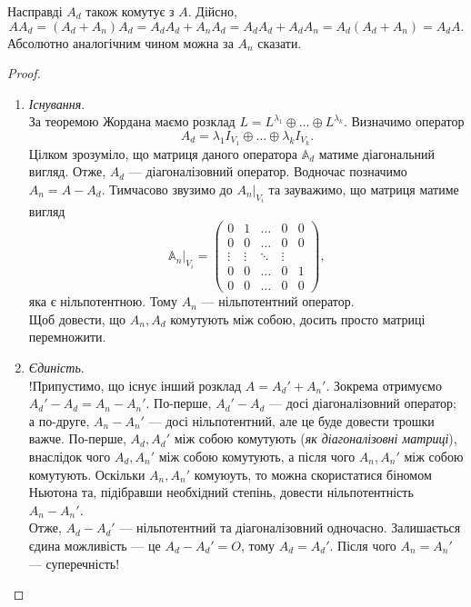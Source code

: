 \documentclass{math_library}
\begin{document}
\begin{remark}
Насправді $A_d$ також комутує з $A$. Дійсно,
\[
A A_d = (A_d + A_n) A_d = A_d A_d + A_n A_d = A_d A_d + A_d A_n = A_d (A_d + A_n) = A_d A.
\]
Абсолютно аналогічним чином можна за $A_n$ сказати.
\end{remark}

\begin{proof}
\begin{enumerate}[topsep=0pt,wide=0pt,label={\Roman*.}]
\item \textit{Існування}.\\
За теоремою Жордана маємо розклад $L = L^{\lambda_1} \oplus \dots \oplus L^{\lambda_k}$. Визначимо оператор
\[
A_d = \lambda_1 I_{V_1} \oplus \dots \oplus \lambda_k I_{V_k}.
\]
Цілком зрозуміло, що матриця даного оператора $\mathbb{A}_d$ матиме діагональний вигляд. Отже, $A_d$ --- діагоналізовний оператор. Водночас позначимо $A_n = A - A_d$. Тимчасово звузимо до ${A_n}|_{V_i}$ та зауважимо, що матриця матиме вигляд
\[ 
{\mathbb{A}_n}|_{V_i} = \begin{pmatrix}
0 & 1 & \dots & 0 & 0 \\
0 & 0 & \dots & 0 & 0\\
\vdots & \vdots & \ddots & \vdots \\
0 & 0 & \dots & 0 & 1 \\
0 & 0 & \dots & 0 & 0
\end{pmatrix},
\]
яка є нільпотентною. Тому $A_n$ --- нільпотентний оператор.\\
Щоб довести, що $A_n, A_d$ комутують між собою, досить просто матриці перемножити.

\item \textit{Єдиність}.\\
!Припустимо, що існує інший розклад $A = A_d' + A_n'$. Зокрема отримуємо $A_d' - A_d = A_n - A_n'$. По-перше, $A_d' - A_d$ --- досі діагоналізовний оператор; а по-друге, $A_n - A_n'$ --- досі нільпотентний, але це буде довести трошки важче. По-перше, $A_d,A_d'$ між собою комутують (\textit{як діагоналізовні матриці}), внаслідок чого $A_d,A_n'$ між собою комутують, а після чого $A_n,A_n'$ між собою комутують. Оскільки $A_n,A_n'$ комуюуть, то можна скористатися біномом Ньютона та, підібравши необхідний степінь, довести нільпотентність $A_n - A_n'$.\\
Отже, $A_d - A_d'$ --- нільпотентний та діагоналізовний одночасно. Залишається єдина можливість --- це $A_d - A_d' = O$, тому $A_d = A_d'$. Після чого $A_n = A_n'$ --- суперечність! \qedhere
\end{enumerate}
\end{proof}
\end{document}
